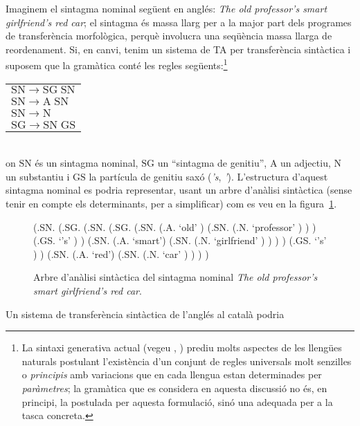 Imaginem el sintagma nominal següent en anglés: \emph{The old professor's
smart girlfriend's red car}; el sintagma és massa llarg per a la
major part dels programes de transferència morfològica, perquè
involucra una seqüència massa llarga de reordenament.  Si, en canvi,
tenim un sistema de TA per transferència sintàctica i suposem que la
gramàtica conté les regles següents:\footnote{La sintaxi generativa
  actual (vegeu \cite{chomsky96b}, \cite{ramos92}) prediu molts
  aspectes de les llengües naturals postulant l'existència d'un
  conjunt de regles universals molt senzilles o \emph{principis} amb
  variacions que en cada llengua estan determinades per
  \emph{paràmetres}; la gramàtica que es considera en aquesta
  discussió no és, en principi, la postulada per aquesta formulació,
  sinó una adequada per a la tasca concreta.} 
\begin{tabular}{l}
$\mathrm{SN}\rightarrow \mathrm{SG}\;\mathrm{SN}$\\
$\mathrm{SN} \rightarrow \mathrm{A}\;\mathrm{SN}$\\
 $\mathrm{SN}\rightarrow \mathrm{N}$\\
$\mathrm{SG}\rightarrow \mathrm{SN}\;\mathrm{GS}$\\
\end{tabular}\\
on $\mathrm{SN}$ és un sintagma nominal, $\mathrm{SG}$ un ``sintagma
de genitiu'', $\mathrm{A}$ un adjectiu, $\mathrm{N}$ un substantiu i
$\mathrm{GS}$ la partícula de genitiu saxó (\emph{'s}, \emph{'}). 
L'estructura d'aquest sintagma nominal es podria representar, usant un
arbre d'anàlisi sintàctica (sense tenir en compte els determinants,
per a simplificar) com es veu en la figura~\ref{fg:arbre1}.
\begin{figure}
\begin{center}
\begin{parsetree}
(.SN. (.SG. (.SN. (.SG. 
                   (.SN. (.A. `old' ) (.SN. (.N. `professor' ) )
                   )
                   (.GS. `{'s}' ) 
                  )
                  (.SN. (.A. `smart') (.SN. (.N. `girlfriend' ) ) )
            )
            (.GS. `{'s}' )
     )
     (.SN. (.A. `red') (.SN. (.N. `car' ) ) ) 
)                  
\end{parsetree}
\end{center}
\caption{Arbre d'anàlisi sintàctica del sintagma nominal \emph{The old
  professor's smart girlfriend's red car}.}
\label{fg:arbre1}
\end{figure}  
Un sistema de transferència sintàctica de l'anglés al català podria
